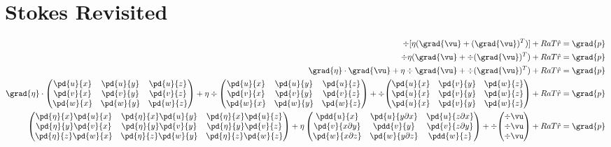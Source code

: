 \chapter{Stokes Revisited}

\begin{align}
\div{[\eta(\grad{\vu} + (\grad{\vu})^T)]} + Ra T \hat{r} & = \grad{p} \label{eq:stokes_momentum_original} \\
\div{\eta(\grad{\vu}} + \div{(\grad{\vu})^T)} + Ra T \hat{r} & = \grad{p} \\
\grad{\eta} \cdot \grad{\vu} + \eta \div{\grad{\vu}} + \div{(\grad{\vu})^T)} + Ra T \hat{r} & = \grad{p} \\
\grad{\eta} \cdot \begin{pmatrix} \pd{u}{x} & \pd{u}{y} & \pd{u}{z} \\ \pd{v}{x} & \pd{v}{y} & \pd{v}{z} \\ \pd{w}{x} & \pd{w}{y} & \pd{w}{z} \end{pmatrix} + \eta \div{\begin{pmatrix} \pd{u}{x} & \pd{u}{y} & \pd{u}{z} \\ \pd{v}{x} & \pd{v}{y} & \pd{v}{z} \\ \pd{w}{x} & \pd{w}{y} & \pd{w}{z} \end{pmatrix}} + \div{\begin{pmatrix} \pd{u}{x} & \pd{v}{y} & \pd{w}{z} \\ \pd{u}{x} & \pd{v}{y} & \pd{w}{z} \\ \pd{u}{x} & \pd{v}{y} & \pd{w}{z} \end{pmatrix}} + Ra T \hat{r} & = \grad{p} \\
\begin{pmatrix} \pd{\eta}{x} \pd{u}{x} & \pd{\eta}{x} \pd{u}{y} & \pd{\eta}{x} \pd{u}{z} \\ \pd{\eta}{y} \pd{v}{x} & \pd{\eta}{y} \pd{v}{y} & \pd{\eta}{y} \pd{v}{z} \\ \pd{\eta}{z} \pd{w}{x} & \pd{\eta}{z} \pd{w}{y} & \pd{\eta}{z} \pd{w}{z} \end{pmatrix} + \eta \begin{pmatrix} \pdd{u}{x} & \pd{u}{y \partial x} & \pd{u}{z \partial x} \\ \pd{v}{x \partial y} & \pdd{v}{y} & \pd{v}{z \partial y} \\ \pd{w}{x \partial z} & \pd{w}{y \partial z} & \pdd{w}{z} \end{pmatrix} + \div{\begin{pmatrix} \div{\vu} \\ \div{\vu} \\ \div{\vu} \end{pmatrix}} + Ra T \hat{r} & = \grad{p} \\

\end{align}

